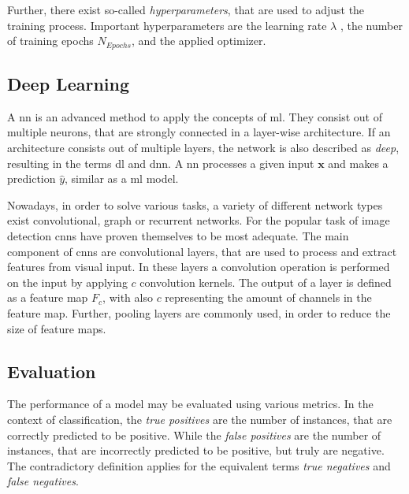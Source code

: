 Further, there exist so-called \textit{hyperparameters}, that are used to adjust the training process.
Important hyperparameters are the learning rate $\lambda$ , the number of training epochs $N_{Epochs}$, and the applied optimizer.


\subsection{Deep Learning}\label{ord:ch2:sec1:subsec2}

A \gls{nn} is an advanced method to apply the concepts of \gls{ml}.
They consist out of multiple neurons, that are strongly connected in a layer-wise architecture.
If an architecture consists out of multiple layers, the network is also described as \textit{deep}, resulting in the terms \gls{dl} and \gls{dnn}.
A \gls{nn} processes a given input $\textbf{x}$ and makes a prediction $\hat{y}$, similar as a \gls{ml} model.

Nowadays, in order to solve various tasks, a variety of different network types exist \eg convolutional, graph or recurrent networks.
For the popular task of image detection \glspl{cnn} have proven themselves to be most adequate.
The main component of \glspl{cnn} are convolutional layers, that are used to process and extract features from visual input.
In these layers a convolution operation is performed on the input by applying $c$ convolution kernels.
The output of a layer is defined as a feature map $F_c$, with also $c$ representing the amount of channels in the feature map.
Further, pooling layers are commonly used, in order to reduce the size of feature maps.


\subsection{Evaluation}\label{ord:ch2:sec1:subsec3}

The performance of a model may be evaluated using various metrics.
In the context of classification, the \textit{true positives} are the number of instances, that are correctly predicted to be positive.
While the \textit{false positives} are the number of instances, that are incorrectly predicted to be positive, but truly are negative.
The contradictory definition applies for the equivalent terms \textit{true negatives} and \textit{false negatives}.

